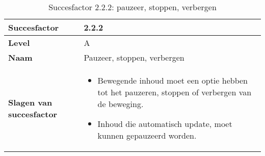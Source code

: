 \begin{table}[H]
    \centering
    \caption{Succesfactor 2.2.2: pauzeer, stoppen, verbergen}
    
    
    \hspace*{-1cm}\begin{tabular}{|l|p{12cm}|} 
        \hline
        \textbf{Succesfactor}                 & 2.2.2                                                                                                                                                                                                                                                                                                                                                                                                                                                                                                          \\ 
        \hline
        \textbf{Level}                        & A                                                                                                                                                                                                                                                                                                                                                                                                                                                                                                                 \\ 
        \hline
        \textbf{Naam}                         & Pauzeer, stoppen, verbergen~                                                                                                                                                                                                                                                                                                                                                                                                                                                                                      \\ 
        \hline
        \textbf{Slagen van succesfactor}      & \begin{itemize}
            \item Bewegende inhoud moet een optie hebben tot het pauzeren, stoppen of verbergen van de beweging. 
            \item Inhoud die automatisch update, moet kunnen gepauzeerd worden.
        \end{itemize}                                                                                                                                                                   \\ 

\end{tabular}
\end{table}
